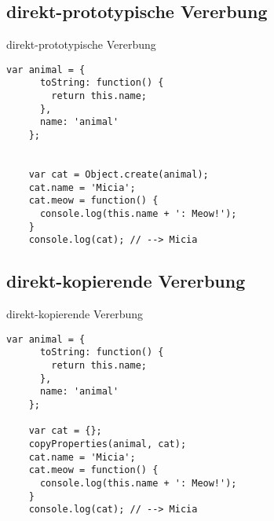 \newcommand{\hla}[1]{\textcolor{stringcolor}{#1}}
\newcommand{\hlb}[1]{\textcolor{keywordcolor}{#1}}


\subsection{direkt-prototypische Vererbung}

\begin{frame}[fragile]{direkt-prototypische Vererbung}
  \begin{lstlisting}[gobble=4]
    var animal = {
      toString: function() {
        return this.name;
      },
      name: 'animal'
    };
    
    
    var cat = Object.create(animal);
    cat.name = 'Micia';
    cat.meow = function() {
      console.log(this.name + ': Meow!');
    }
    console.log(cat); // --> Micia
  \end{lstlisting}
\end{frame}

\subsection{direkt-kopierende Vererbung}

\begin{frame}[fragile]{direkt-kopierende Vererbung}
  \begin{lstlisting}[gobble=4]
    var animal = {
      toString: function() {
        return this.name;
      },
      name: 'animal'
    };
      
    var cat = {};
    copyProperties(animal, cat);
    cat.name = 'Micia';
    cat.meow = function() {
      console.log(this.name + ': Meow!');
    }
    console.log(cat); // --> Micia
  \end{lstlisting}
\end{frame}

